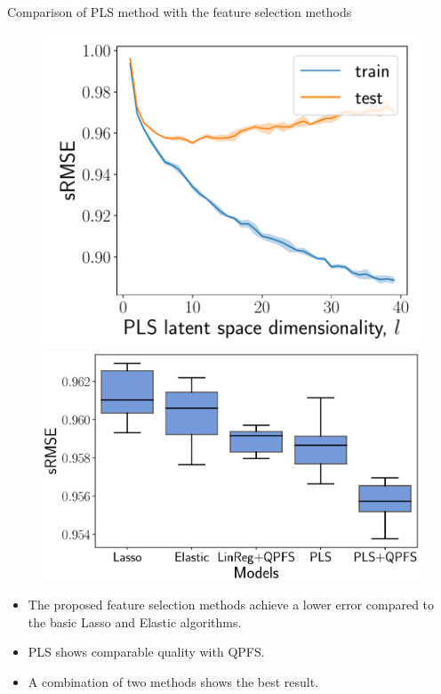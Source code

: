 \documentclass[10pt]{beamer}
\begin{document}
\begin{frame}{Comparison of PLS method with the feature selection methods}

\begin{figure}[h]
	\begin{minipage}{.43\linewidth}
		\centering
		\includegraphics[width=1.\linewidth]{figs/pls_vs_k}
	\end{minipage}%
	\begin{minipage}{.57\linewidth}
		\centering
		\includegraphics[width=1.\linewidth]{figs/models2}
	\end{minipage}
\end{figure}
\begin{itemize}
	\item The proposed feature selection methods achieve a lower error compared to the basic Lasso and Elastic algorithms.
	\item PLS shows comparable quality with QPFS.
	\item A combination of two methods shows the best result.
	\end{itemize}

\end{frame}
\end{document}
